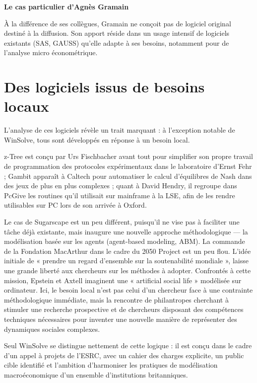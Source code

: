 \textbf{Le cas particulier d’Agnès Gramain}

À la différence de ses collègues, Gramain ne conçoit pas de logiciel original destiné à la diffusion. Son apport réside dans un usage intensif de logiciels existants (SAS, GAUSS) qu’elle adapte à ses besoins, notamment pour de l'analyse micro économétrique.




\section{Des logiciels issus de besoins locaux}


L’analyse de ces logiciels révèle un trait marquant : à l’exception notable de WinSolve, tous sont développés en réponse à un besoin local. 

z-Tree est conçu par Urs Fischbacher avant tout pour simplifier son propre travail de programmation des protocoles expérimentaux dans le laboratoire d’Ernst Fehr ; Gambit apparaît à Caltech pour automatiser le calcul d’équilibres de Nash dans des jeux de plus en plus complexes ; quant à David Hendry, il regroupe dans PcGive les routines qu’il utilisait sur mainframe à la LSE, afin de les rendre utilisables sur PC lors de son arrivée à Oxford. 

Le cas de Sugarscape est un peu différent, puisqu’il ne vise pas à faciliter une tâche déjà existante, mais inaugure une nouvelle approche méthodologique — la modélisation basée sur les agents (agent-based modeling, ABM). 
La commande de la Fondation MacArthur dans le cadre du 2050 Project est un peu flou. L’idée initiale de « prendre un regard d’ensemble sur la soutenabilité mondiale », laisse une grande liberté aux chercheurs sur les méthodes à adopter. Confrontés à cette mission, Epstein et Axtell imaginent une « artificial social life » modélisée sur ordinateur. Ici, le besoin local n’est pas celui d’un chercheur face à une contrainte méthodologique immédiate, mais la rencontre de philantropes cherchant à stimuler une recherche prospective et de chercheurs disposant des compétences techniques nécessaires pour inventer une nouvelle manière de représenter des dynamiques sociales complexes.


Seul WinSolve se distingue nettement de cette logique : il est conçu dans le cadre d’un appel à projets de l’ESRC, avec un cahier des charges explicite, un public cible identifié et l’ambition d’harmoniser les pratiques de modélisation macroéconomique d’un ensemble d’institutions britanniques.

